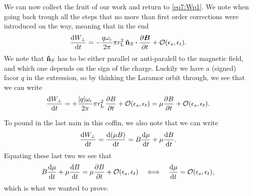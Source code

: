 \documentclass[11pt,a4paper, 
swedish, english %
]{article}
\newcommand{\wc}{\ensuremath{\omega_{\text{c}}}}
\newcommand{\rL}{\ensuremath{r_{\text{L}}}}
\begin{document}
We can now collect the fruit of our work and return to
\eqref{eq7:Wp1}. We note when going back trough all the steps that no
more than first order corrections were introduced on the way, meaning
that in the end
\begin{equation}
\dv{W_\perp}{t} = -\frac{q\wc}{2\pi}\pi\rL^2 \,
\vu{n}_S\vdot\pdv{\vb*B}{t}
+\order{\epsilon_s, \epsilon_t}.
\end{equation}
We note that $\vu{n}_S$ has to be either parallel or anti-paralell to
the magnetic field, and which one depends on the sign of the
charge. Luckily we have a (signed) facor $q$ in the extression, so by
thinking the Laramor orbit through, we see that we can write
\begin{equation}
\dv{W_\perp}{t} = +\frac{|q|\wc}{2\pi}\pi\rL^2 \,\pdv{B}{t}
+\order{\epsilon_s, \epsilon_t}
=\mu\pdv{B}{t} +\order{\epsilon_s, \epsilon_t}.
\end{equation}

To pound in the last nain in this coffin, we also note that we can
write
\begin{equation}
\dv{W_\perp}{t} = \dv{(\mu B)}{t}
=B\dv{\mu}{t}+\mu\dv{B}{t}.
\end{equation}
Equating these last two we see that
\begin{equation}
B\dv{\mu}{t}+\mu\dv{B}{t}=\mu\pdv{B}{t} 
+\order{\epsilon_s, \epsilon_t}
\quad\Longleftrightarrow\quad
\dv{\mu}{t}=\order{\epsilon_s, \epsilon_t},
\end{equation}
which is what we wanted to prove.

\end{document}

